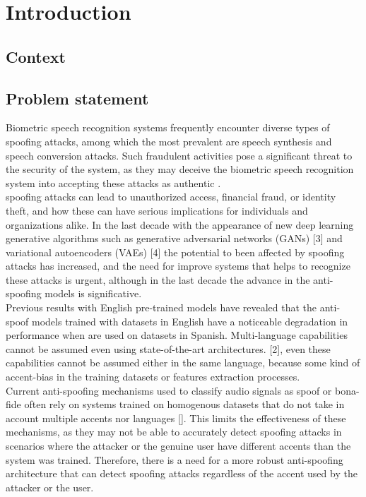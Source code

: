 \chapter{Introduction}
\label{cha:introduction}

\section{Context}
\label{sec:Context}

\section{Problem statement}
\label{sec:Problem statement}

Biometric speech recognition systems frequently encounter diverse types of spoofing attacks, among which the most prevalent are speech synthesis and speech conversion attacks. Such fraudulent activities pose a significant threat to the security of the system, as they may deceive the biometric speech recognition system into accepting these attacks as authentic \cite{xue2023physiological}.\\

spoofing attacks can lead to unauthorized access, financial fraud, or identity theft, and how these can have serious implications for individuals and organizations alike. In the last decade with the appearance of new deep learning generative algorithms such as generative adversarial networks (GANs) [3] and variational autoencoders (VAEs) [4] the potential to been affected by spoofing attacks has increased, and the need for improve systems that helps to recognize these attacks is urgent, although in the last decade the advance in the anti-spoofing models is significative.\\

Previous results with English pre-trained models have revealed that the anti-spoof models trained with datasets in English have a noticeable degradation in performance when are used on datasets in Spanish. Multi-language capabilities cannot be assumed even using state-of-the-art architectures. [2], even these capabilities cannot be assumed either in the same language, because some kind of accent-bias in the training datasets or features extraction processes.\\

Current anti-spoofing mechanisms used to classify audio signals as spoof or bona-fide often rely on systems trained on homogenous datasets that do not take in account multiple accents nor languages []. This limits the effectiveness of these mechanisms, as they may not be able to accurately detect spoofing attacks in scenarios where the attacker or the genuine user have different accents than the system was trained. Therefore, there is a need for a more robust anti-spoofing architecture that can detect spoofing attacks regardless of the accent used by the attacker or the user.\\


